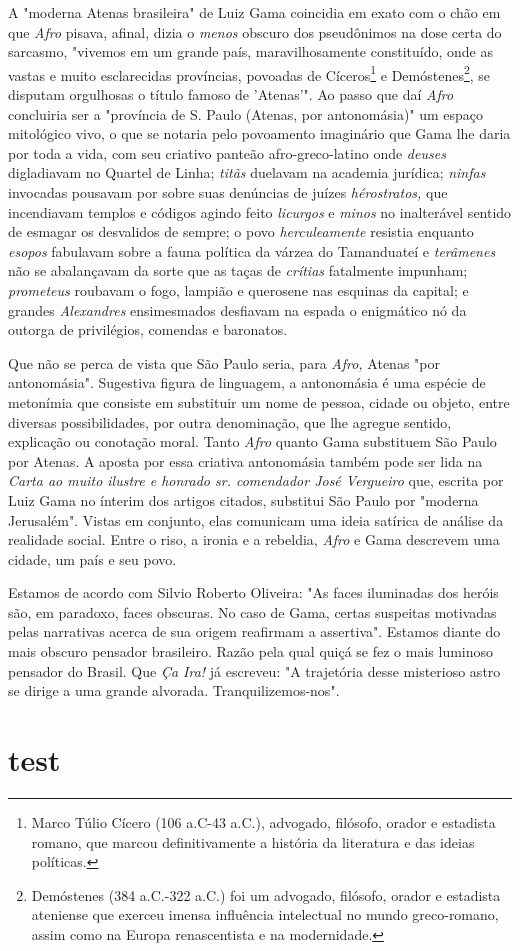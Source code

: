 A "moderna Atenas brasileira" de Luiz Gama coincidia em exato com o chão
em que \emph{Afro} pisava, afinal, dizia o \emph{menos} obscuro dos
pseudônimos na dose certa do sarcasmo, "vivemos em um grande país,
maravilhosamente constituído, onde as vastas e muito esclarecidas
províncias, povoadas de Cíceros\footnote{Marco Túlio Cícero (106
  a.C-43 a.C.), advogado, filósofo, orador e estadista romano, que
  marcou definitivamente a história da literatura e das ideias
  políticas.} e Demóstenes\footnote{Demóstenes (384 a.C.-322 a.C.) foi
  um advogado, filósofo, orador e estadista ateniense que exerceu imensa
  influência intelectual no mundo greco-romano, assim como na Europa
  renascentista e na modernidade.}, se disputam orgulhosas o título
famoso de 'Atenas'". Ao passo que daí \emph{Afro} concluiria ser a
"província de S. Paulo (Atenas, por antonomásia)" um espaço mitológico
vivo, o que se notaria pelo povoamento imaginário que Gama lhe daria por
toda a vida, com seu criativo panteão afro-greco-latino onde
\emph{deuses} digladiavam no Quartel de Linha; \emph{titãs} duelavam na
academia jurídica; \emph{ninfas} invocadas pousavam por sobre suas
denúncias de juízes \emph{hérostratos,} que incendiavam templos e
códigos agindo feito \emph{licurgos} e \emph{minos} no inalterável
sentido de esmagar os desvalidos de sempre; o povo \emph{herculeamente}
resistia enquanto \emph{esopos} fabulavam sobre a fauna política da
várzea do Tamanduateí e \emph{terâmenes} não se abalançavam da sorte que
as taças de \emph{crítias} fatalmente impunham; \emph{prometeus}
roubavam o fogo, lampião e querosene nas esquinas da capital; e grandes
\emph{Alexandres} ensimesmados desfiavam na espada o enigmático nó da
outorga de privilégios, comendas e baronatos.

Que não se perca de vista que São Paulo seria, para \emph{Afro,} Atenas
"por antonomásia". Sugestiva figura de linguagem, a antonomásia é uma
espécie de metonímia que consiste em substituir um nome de pessoa,
cidade ou objeto, entre diversas possibilidades, por outra denominação,
que lhe agregue sentido, explicação ou conotação moral. Tanto
\emph{Afro} quanto Gama substituem São Paulo por Atenas. A aposta por
essa criativa antonomásia também pode ser lida na \emph{Carta ao muito
ilustre e honrado sr. comendador José Vergueiro} que, escrita por Luiz
Gama no ínterim dos artigos citados, substitui São Paulo por "moderna
Jerusalém". Vistas em conjunto, elas comunicam uma ideia satírica de
análise da realidade social. Entre o riso, a ironia e a rebeldia,
\emph{Afro} e Gama descrevem uma cidade, um país e seu povo.

Estamos de acordo com Silvio Roberto Oliveira: "As faces iluminadas dos
heróis são, em paradoxo, faces obscuras. No caso de Gama, certas
suspeitas motivadas pelas narrativas acerca de sua origem reafirmam a
assertiva". Estamos diante do mais obscuro pensador brasileiro. Razão
pela qual quiçá se fez o mais luminoso pensador do Brasil. Que \emph{Ça
Ira!} já escreveu: "A trajetória desse misterioso astro se dirige a uma
grande alvorada. Tranquilizemos-nos".

\part{test}